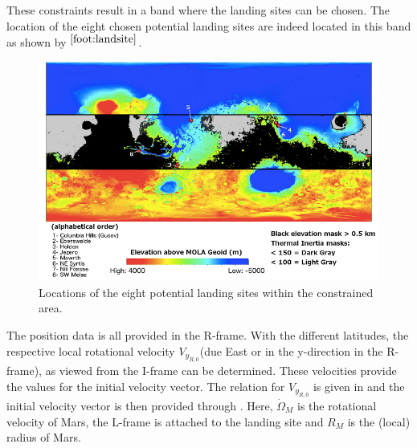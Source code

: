 These constraints result in a band where the landing sites can be chosen. The location of the eight chosen potential landing sites are indeed located in this band as shown by  $^{\ref{foot:landsite}}$.



\begin{figure}[!ht]
\centering
\includegraphics[width=1.0\textwidth]{figures/launcher_methods/mars2020_land_grant2015landing.png}
\caption{Locations of the eight potential landing sites within the constrained area.}
\label{fig:mars2020_land_grant2015landing}
\end{figure} 

The position data is all provided in the R-frame. With the different latitudes, the respective local rotational velocity $V_{y_{R,0}}$(due East or in the y-direction in the R-frame), as viewed from the I-frame can be determined. These velocities provide the values for the initial velocity vector. The relation for $V_{y_{R,0}}$ is given in  and the initial velocity vector is then provided through . Here, $\dot{\Omega}_{M}$ is the rotational velocity of Mars, the L-frame is attached to the landing site and $R_{M}$ is the (local) radius of Mars.

